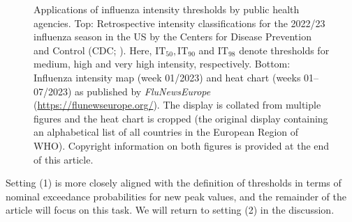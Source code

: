 \documentclass[12pt]{article}
\begin{document}
\begin{figure}[h!]
\begin{center}

\medskip

\end{center}
\caption{Applications of influenza intensity thresholds by public health agencies. Top: Retrospective intensity classifications for the 2022/23 influenza season in the US by the Centers for Disease Prevention and Control (CDC; \citealt{White2023}). Here, $\text{IT}_{50}, \text{IT}_{90}$ and $\text{IT}_{98}$ denote thresholds for medium, high and very high intensity, respectively. Bottom: Influenza intensity map (week 01/2023) and heat chart (weeks 01--07/2023) as published by \textit{FluNewsEurope} (\url{https://flunewseurope.org/}). The display is collated from multiple figures and the heat chart is cropped (the original display containing an alphabetical list of all countries in the European Region of WHO). Copyright information on both figures is provided at the end of this article. %
}
\label{fig:maps}
\end{figure}
\noindent Setting (1) is more closely aligned with the definition of thresholds in terms of nominal exceedance probabilities for new peak values, and the remainder of the article will focus on this task. We will return to setting (2) in the discussion.
\end{document}
